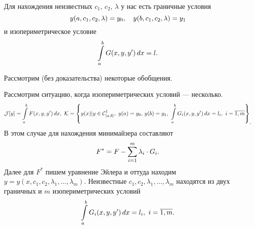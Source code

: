 Для нахождения неизвестных $c_1$, $c_2$, $\lambda$ у нас есть граничные условия 
\begin{equation*}
	\hfill y(a,c_1,c_2,\lambda)=y_0,\quad y(b,c_1,c_2,\lambda)=y_1\hfill
\end{equation*}
и изопериметрическое условие
\begin{equation*}
	\hfill\int\limits_a^b G(x,y,y')\,dx=l.\hfill
\end{equation*} 

Рассмотрим (без доказательства) некоторые обобщения.
\begin{enumerateD}
	\item Рассмотрим ситуацию, когда изопериметрических условий --- несколько.
	\begin{equation*}
		\J[y]=\int\limits_a^b F(x,y,y')\,dx,\ \K=\left\{y(x)|y\in\Cfn[{[a,b]}]{1},\ y(a)=y_0,\,y(b)=y_1,\ \int\limits_a^b G_i(x,y,y')\,dx=l_i,\ i=\overline{1,m}\right\}_{\displaystyle.}
	\end{equation*}
	В этом случае для нахождения минимайзера составляют 
	\begin{equation*}
		\hfill F^{\ast}=F-\sum\limits_{i=1}^m\lambda_i\cdot G_i.\hfill
	\end{equation*}
	Далее для $F^{\ast}$ пишем уравнение Эйлера и оттуда находим $y=y(x,c_1,c_2,\lambda_1,\ldots,\lambda_m)$. Неизвестные $c_1,c_2,\lambda_1,\ldots,\lambda_m$ находятся из двух граничных и $m$ изопериметрических условий
	\begin{equation*}
		\hfill\int\limits_a^b G_i(x,y,y')\,dx=l_i,\ i=\overline{1,m}.\hfill
	\end{equation*}
	

\end{enumerateD}
